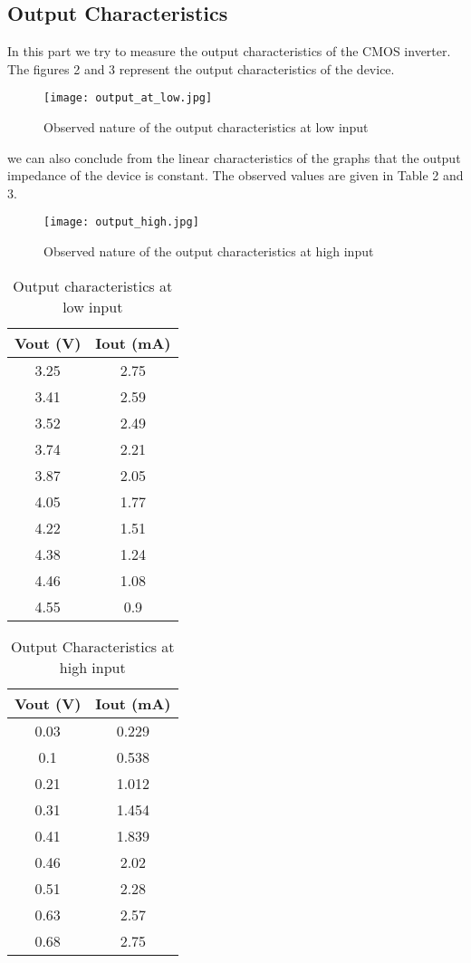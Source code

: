 \documentclass[12pt]{article}
\begin{document}
\subsection{Output Characteristics}
In this part we try to measure the output characteristics of the CMOS inverter. The figures 2 and 3 represent the output characteristics of the device.
\begin{figure}[H]
\texttt{[image: output\_at\_low.jpg]}
\centering
\caption{Observed nature of the output characteristics at low input}
\end{figure}
 we can also conclude from the linear characteristics of the graphs that the output impedance of the device is constant. The observed values are given in Table 2 and 3.
\begin{figure}[H]
\texttt{[image: output\_high.jpg]}
\centering
\caption{Observed nature of the output characteristics at high input}
\end{figure}
\begin{table}[H]
\centering
\begin{tabular}{| c | c |} 
\hline
\textbf{ Vout (V)} &\textbf{ Iout (mA)} \\ 
\hline
3.25  & 2.75  \\
3.41  & 2.59  \\
3.52  & 2.49  \\
3.74  & 2.21  \\
3.87  & 2.05  \\
4.05  & 1.77  \\
4.22  & 1.51  \\
4.38  & 1.24  \\
4.46  & 1.08  \\
4.55  & 0.9 \\
\hline
\end{tabular}
\caption{Output characteristics at low input}

\end{table}

\begin{table}
\centering
\begin{tabular}{| c | c |} 
\hline
\textbf{ Vout (V)} &\textbf{ Iout (mA)} \\ 
\hline

0.03  & 0.229 \\
0.1 & 0.538 \\
0.21  & 1.012 \\
0.31  & 1.454 \\
0.41  & 1.839 \\
0.46  & 2.02  \\
0.51  & 2.28  \\
0.63  & 2.57  \\
0.68  & 2.75  \\
\hline
\end{tabular}
\caption{Output Characteristics at high input}
\label{table:demotable}
\end{table}
\end{document}
